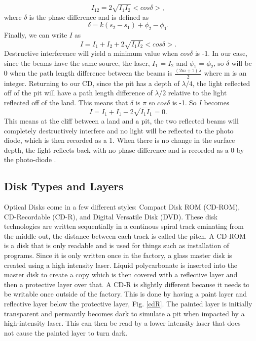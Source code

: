 \documentclass[ notitlepage, numerical, 11pt]{revtex4-1} %
\begin{document}
\begin{equation}
I_{12} = 2\sqrt{I_1 I_2}<cos\delta>,
\label{iInf2}
\end{equation}
where $\delta$ is the phase difference and is defined as 
\begin{equation}
\delta = k(s_2 - s_1) +\phi_2 -\phi_1.
\label{delta}
\end{equation}
Finally, we can write $I$ as 
\begin{equation}
I = I_1 + I_2 +  2\sqrt{I_1 I_2}<cos\delta>.
\label{finalI}
\end{equation}
Destructive interference will yield a minimum value when $cos\delta$ is -1. In our case, since the beams have the same source, the laser, $I_1$ = $I_2$ and $\phi_1$ =  $\phi_2$, so $\delta$ will be 0 when the path length difference between the beams is $\frac{(2m+1)\lambda}{2}$ where m is an integer. Returning to our CD, since the pit has a depth of $\lambda/4$, the light reflected off of the pit will have a path length difference of $\lambda/2$ relative to the light reflected off of the land. This means that $\delta$ is $\pi$ so $cos\delta$ is -1. So $I$ becomes
\begin{equation}
I = I_1 + I_1 - 2\sqrt{I_1 I_1} = 0.
\label{finalI2}
\end{equation}
This means at the cliff between a land and a pit, the two reflected beams will completely destructively interfere and no light will be reflected to the photo diode, which is then recorded as a 1. When there is no change in the surface depth, the light reflects back with no phase difference and is recorded as a 0 by the photo-diode \cite{memory}.

\subsection{Disk Types and Layers}
Optical Disks come in a few different styles: Compact Disk ROM (CD-ROM), CD-Recordable (CD-R), and Digital Versatile Disk (DVD). These disk technologies are written sequentially in a continous spiral track eminating from the middle out, the distance between each track is called the pitch. A CD-ROM is a disk that is only readable and is used for things such as installation of programs. Since it is only written once in the factory, a glass master disk is created using a high intensity laser. Liquid polycarbonate is inserted into the master disk to create a copy which is then covered with a reflective layer and then a protective layer over that. 
A CD-R is slightly different because it needs to be writable once outside of the factory. This is done by having a paint layer and reflective layer below the protective layer, Fig. \ref{cdR}. The painted layer is initially transparent and permantly becomes dark to simulate a pit when impacted by a high-intensity laser. This can then be read by a lower intensity laser that does not cause the painted layer to turn dark.
\end{document}
